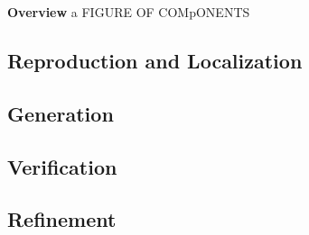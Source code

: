 \noindent\textbf{Overview}
a FIGURE OF COMpONENTS


\subsection{Reproduction and Localization}



\subsection{Generation}

\subsection{Verification}

\subsection{Refinement}






